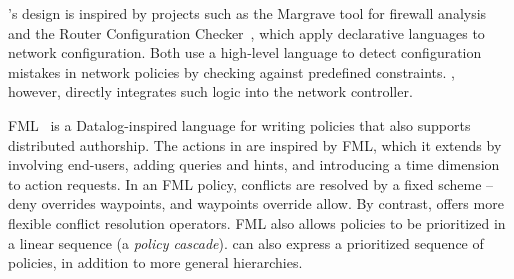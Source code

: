 \sys's design is inspired by projects such as the Margrave tool for firewall 
analysis~\cite{Nelson:2010} and the Router Configuration
Checker~\cite{Feamster:2005}, which apply declarative languages to
network configuration. Both use a high-level language to detect configuration 
mistakes in network policies by checking against predefined constraints. 
\sys, however, directly integrates such logic into the network
controller.

FML~\cite{Hinrichs:2009} is a Datalog-inspired language for writing
policies that also supports distributed authorship.  
The actions in \sys are inspired by
FML, which it
extends by involving end-users, adding queries and hints, and
introducing a time dimension to action requests.
In an FML policy,
conflicts are resolved by a fixed scheme -- deny overrides waypoints,
and waypoints override allow. By contrast, \sys offers more
flexible conflict resolution operators.
%
FML also allows policies to be prioritized in a linear sequence (a
\emph{policy cascade}). \sys can also express a prioritized sequence of
policies, in addition to more general hierarchies.  


{\color{red}

}

